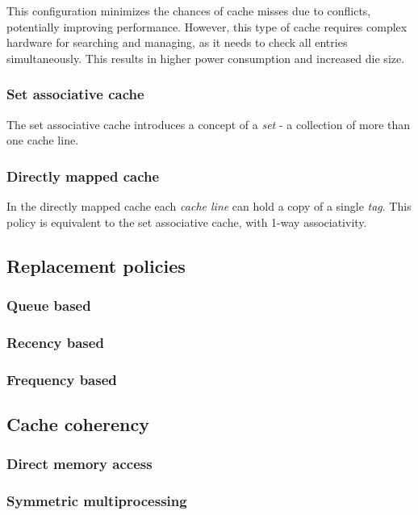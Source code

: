 \noindent This configuration minimizes the chances of cache misses due to conflicts,
potentially improving performance. However, this type of cache requires
complex hardware for searching and managing, as it needs to check all entries
simultaneously. This results in higher power consumption and increased die size.

\subsubsection{Set associative cache}
The set associative cache introduces a concept of a \textit{set} - a collection
of more than one cache line.

\subsubsection{Directly mapped cache}
In the directly mapped cache each \textit{cache line} can hold a copy of
a single \textit{tag}. This policy is equivalent to the set associative cache, with
1-way associativity.

%
\subsection{Replacement policies}
\subsubsection{Queue based}
\subsubsection{Recency based}
\subsubsection{Frequency based}
%
\subsection{Cache coherency}
\subsubsection{Direct memory access}
\subsubsection{Symmetric multiprocessing}
%

